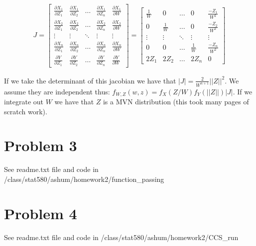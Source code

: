 \documentclass{article}\usepackage[]{graphicx}\usepackage[]{color}
\begin{document}
\begin{align*}
J = \begin{bmatrix}
\frac{\partial X_1}{\partial Z_1} & \frac{\partial X_1}{\partial Z_2} & \dots & \frac{\partial X_1}{\partial Z_n} & \frac{\partial X_1}{\partial W} \\
\frac{\partial X_2}{\partial Z_1} & \frac{\partial X_2}{\partial Z_2} & \dots & \frac{\partial X_2}{\partial Z_n} & \frac{\partial X_2}{\partial W} \\
\vdots & \vdots & \ddots & \vdots & \vdots \\
\frac{\partial X_n}{\partial Z_1} & \frac{\partial X_n}{\partial Z_2} & \dots & \frac{\partial X_n}{\partial Z_n} & \frac{\partial X_n}{\partial W} \\
\frac{\partial Y}{\partial Z_1} & \frac{\partial Y}{\partial Z_2} & \dots & \frac{\partial Y}{\partial Z_n} & \frac{\partial Y}{\partial W}
\end{bmatrix} = 
\begin{bmatrix}
\frac{1}{W} & 0 & \dots & 0 & \frac{-Z_1}{W^2}\\
0 & \frac{1}{W} & \dots & 0 & \frac{-Z_2}{W^2}\\
\vdots & \vdots & \ddots & \vdots & \vdots \\
0 & 0 & \dots & \frac{1}{W} & \frac{-Z_n}{W^2}\\
2Z_1 & 2Z_2 & \dots & 2Z_n & 0
\end{bmatrix}
\end{align*}

If we take the determinant of this jacobian we have that $|J| = \frac{2}{W^{n + 1}}||Z||^2$.  We assume they are independent thus: $f_{W,Z}(w,z) = f_X(Z/W) f_Y(||Z||) |J|$.  If we integrate out $W$ we have that $Z$ is a MVN distribution (this took many pages of scratch work).

\section{Problem 3}
See readme.txt file and code in /class/stat580/ashum/homework2/function\_passing

\section{Problem 4}
See readme.txt file and code in /class/stat580/ashum/homework2/CCS\_run
\end{document}
